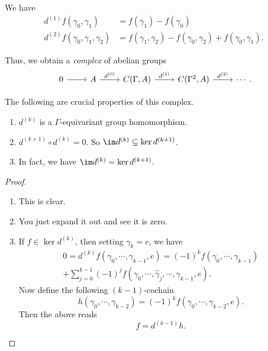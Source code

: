 \documentclass[a4paper]{article}
\begin{document}
\begin{eg}
  We have
  \begin{align*}
    d^{(1)} f(\gamma_0, \gamma_1) &= f(\gamma_1) - f(\gamma_0)\\
    d^{(2)} f(\gamma_0, \gamma_1, \gamma_2) &= f(\gamma_1, \gamma_2) - f(\gamma_0, \gamma_2) + f(\gamma_0, \gamma_1).
  \end{align*}
\end{eg}

Thus, we obtain a \emph{complex} of abelian groups
\[
  \begin{tikzcd}
    0 \ar[r] & A \ar[r, "d^{(0)}"] & C(\Gamma, A) \ar[r, "d^{(1)}"] & C(\Gamma^2, A) \ar[r, "d^{(2)}"] & \cdots
  \end{tikzcd}.
\]

The following are crucial properties of this complex.
\begin{lemma}\leavevmode
  \begin{enumerate}
    \item $d^{(k)}$ is a $\Gamma$-equivariant group homomorphism.
    \item $d^{(k + 1)} \circ d^{(k)} = 0 $. So $\im d^{(k)} \subseteq \ker d^{(k + 1)}$.
    \item In fact, we have $\im d^{(k)} = \ker d^{(k + 1)}$.
  \end{enumerate}
\end{lemma}

\begin{proof}\leavevmode
  \begin{enumerate}
    \item This is clear.
    \item You just expand it out and see it is zero.
    \item If $f \in \ker d^{(k)}$, then setting $\gamma_k = e$, we have
      \begin{multline*}
        0 = d^{(k)} f(\gamma_0, \cdots, \gamma_{k - 1}, e) = (-1)^k f(\gamma_0, \cdots, \gamma_{k - 1}) \\
        + \sum_{j = 0}^{k - 1} (-1)^j f(\gamma_0, \cdots, \hat{\gamma}_j, \cdots, \gamma_{k - 1}, e).
      \end{multline*}
      Now define the following $(k - 1)$-cochain
      \[
        h(\gamma_0, \cdots, \gamma_{k - 2}) = (-1)^k f(\gamma_0, \cdots, \gamma_{k - 2}, e).
      \]
      Then the above reads
      \[
        f = d^{(k - 1)} h.
      \]
  \end{enumerate}
\end{proof}
\end{document}
